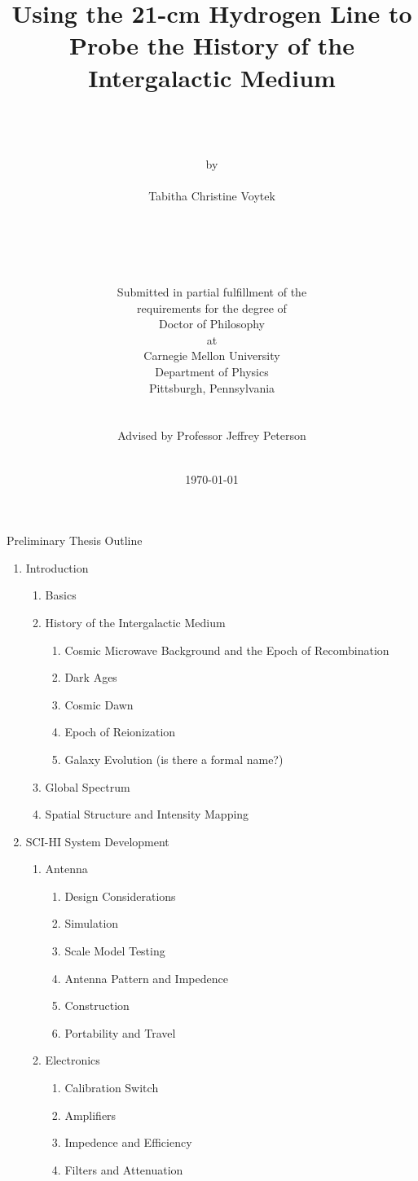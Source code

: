 \documentclass[12pt,twoside]{report}
\author{\\
	\\
	\\
	by \\
	\\
      	Tabitha Christine Voytek \\
	\\
	\\
	\\
	\\
	\\
        Submitted in partial fulfillment of the \\
        requirements for the degree of \\
        Doctor of Philosophy \\
        at \\
        Carnegie Mellon University \\
        Department of Physics \\
        Pittsburgh, Pennsylvania \\
	\\
        \\
	Advised by Professor Jeffrey Peterson
	\\
	\\
}
\title{\bf{
Using the 21-cm Hydrogen Line to Probe the History of the Intergalactic Medium 
}}
\date{\today}
\begin{document}
Preliminary Thesis Outline

\begin{enumerate}
\item Introduction

\begin{enumerate}
\item \cm Basics
\item History of the Intergalactic Medium

\begin{enumerate}
\item Cosmic Microwave Background and the Epoch of Recombination
\item Dark Ages
\item Cosmic Dawn
\item Epoch of Reionization
\item Galaxy Evolution (is there a formal name?)
\end{enumerate}

\item Global \cm Spectrum
\item \cm Spatial Structure and Intensity Mapping

\end{enumerate}

\item SCI-HI System Development

\begin{enumerate}
\item Antenna

\begin{enumerate}
\item Design Considerations
\item Simulation
\item Scale Model Testing
\item Antenna Pattern and Impedence
\item Construction
\item Portability and Travel
\end{enumerate}

\item Electronics

\begin{enumerate}
\item Calibration Switch
\item Amplifiers
\item Impedence and Efficiency
\item Filters and Attenuation
\end{enumerate}


\end{enumerate}
\end{enumerate}
\end{document}
